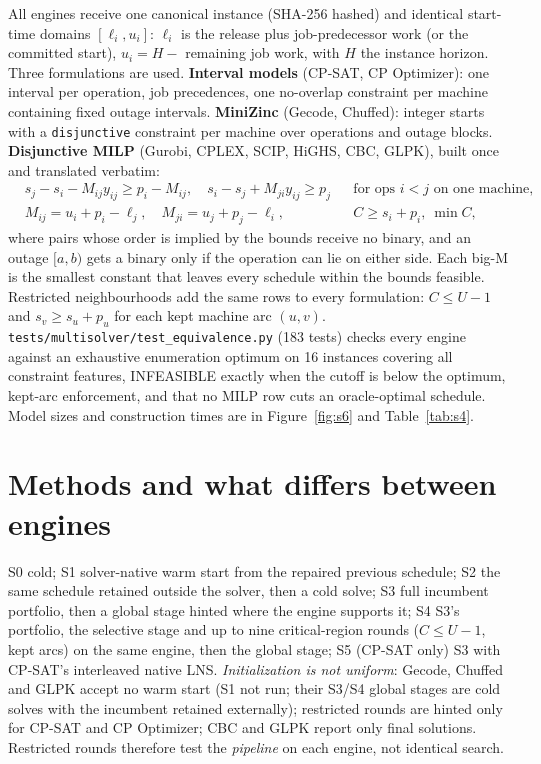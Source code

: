 \documentclass[10pt]{article}
\begin{document}
All engines receive one canonical instance (SHA-256 hashed) and identical start-time domains $[\ell_i, u_i]$: $\ell_i$ is the release plus job-predecessor work (or the committed start), $u_i = H - $ remaining job work, with $H$ the instance horizon. Three formulations are used. \textbf{Interval models} (CP-SAT, CP Optimizer): one interval per operation, job precedences, one no-overlap constraint per machine containing fixed outage intervals. \textbf{MiniZinc} (Gecode, Chuffed): integer starts with a \texttt{disjunctive} constraint per machine over operations and outage blocks. \textbf{Disjunctive MILP} (Gurobi, CPLEX, SCIP, HiGHS, CBC, GLPK), built once and translated verbatim:
\begin{align*}
& s_j - s_i - M_{ij} y_{ij} \ge p_i - M_{ij}, \quad s_i - s_j + M_{ji} y_{ij} \ge p_j && \text{for ops } i<j \text{ on one machine},\\
& M_{ij} = u_i + p_i - \ell_j, \quad M_{ji} = u_j + p_j - \ell_i, && C \ge s_i + p_i,\ \min C,
\end{align*}
where pairs whose order is implied by the bounds receive no binary, and an outage $[a,b)$ gets a binary only if the operation can lie on either side. Each big-M is the smallest constant that leaves every schedule within the bounds feasible. Restricted neighbourhoods add the same rows to every formulation: $C \le U-1$ and $s_v \ge s_u + p_u$ for each kept machine arc $(u,v)$. \texttt{tests/multisolver/test\_equivalence.py} (183 tests) checks every engine against an exhaustive enumeration optimum on 16 instances covering all constraint features, INFEASIBLE exactly when the cutoff is below the optimum, kept-arc enforcement, and that no MILP row cuts an oracle-optimal schedule. Model sizes and construction times are in Figure~\ref{fig:s6} and Table~\ref{tab:s4}.

\section{Methods and what differs between engines}

S0 cold; S1 solver-native warm start from the repaired previous schedule; S2 the same schedule retained outside the solver, then a cold solve; S3 full incumbent portfolio, then a global stage hinted where the engine supports it; S4 S3's portfolio, the selective stage and up to nine critical-region rounds ($C\le U-1$, kept arcs) on the same engine, then the global stage; S5 (CP-SAT only) S3 with CP-SAT's interleaved native LNS. \emph{Initialization is not uniform}: Gecode, Chuffed and GLPK accept no warm start (S1 not run; their S3/S4 global stages are cold solves with the incumbent retained externally); restricted rounds are hinted only for CP-SAT and CP Optimizer; CBC and GLPK report only final solutions. Restricted rounds therefore test the \emph{pipeline} on each engine, not identical search.
\end{document}
